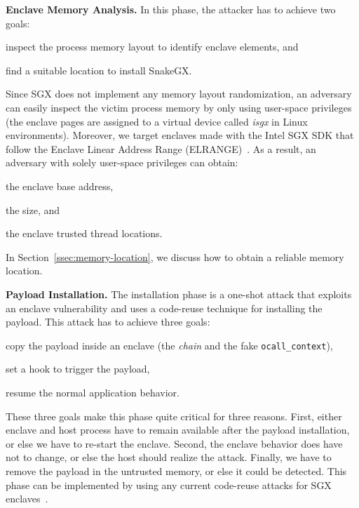 \textbf{Enclave Memory Analysis.}
In this phase, the attacker has to achieve two goals:
\begin{enumerate*}[label=(\roman*)]
	\item inspect the process memory layout to identify enclave elements, and
	\item find a suitable location to install SnakeGX.
\end{enumerate*}
Since SGX does not implement any memory layout randomization, an adversary
can easily inspect the victim process memory by only using user-space 
privileges (\eg the enclave pages are assigned to a virtual device called 
\emph{isgx} in Linux environments).
Moreover, we target enclaves made with the Intel SGX SDK that follow the 
Enclave Linear Address Range (ELRANGE)~\citep{costan2016intel}.
As a result, an adversary with solely user-space privileges can obtain:
\begin{enumerate*}[label=(\roman*)]
	\item the enclave base address,
	\item the size, and
	\item the enclave trusted thread locations.
\end{enumerate*}
In Section~\ref{ssec:memory-location}, we discuss how to obtain a reliable 
memory location.

\textbf{Payload Installation.}
The installation phase is a one-shot attack that exploits an enclave 
vulnerability and uses a code-reuse technique for installing the payload.
This attack has to achieve three goals:
\begin{enumerate*}[label=(\roman*)]
	\item copy the payload inside an enclave (\eg the \emph{chain} and the 
	fake \texttt{ocall\_context}),
	\item set a hook to trigger the payload,
	\item resume the normal application behavior.
\end{enumerate*}
These three goals make this phase quite critical for three reasons. 
First, either enclave and host process have to remain available after the 
payload installation, or else we have to re-start the enclave.
Second, the enclave behavior does have not to change, or else the host should 
realize the attack.
Finally, we have to remove the payload in the untrusted memory, or else it 
could be detected.
This phase can be implemented by using any current code-reuse attacks for SGX
enclaves~\citep{lee2017hacking,biondo2018guard}.

